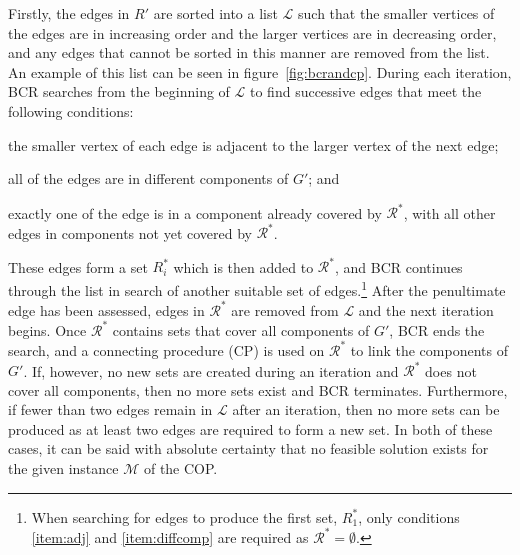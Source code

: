 \documentclass[authoryear]{elsarticle}
\begin{document}
Firstly, the edges in $R'$ are sorted into a list $\mathcal{L}$ such that the smaller vertices of the edges are in increasing order and the larger vertices are in decreasing order, and any edges that cannot be sorted in this manner are removed from the list. An example of this list can be seen in figure~\ref{fig:bcrandcp}. During each iteration, BCR searches from the beginning of $\mathcal{L}$ to find successive edges that meet the following conditions:
\begin{enumerate*}[label={(\roman*)}]
	\item the smaller vertex of each edge is adjacent to the larger vertex of the next edge;\label{item:adj}
	\item all of the edges are in different components of $G'$; \label{item:diffcomp} and
	\item exactly one of the edge is in a component already covered by $\mathcal{R}^*$, with all other edges in components not yet covered by $\mathcal{R}^*$.\label{item:overlap}
\end{enumerate*} 
These edges form a set $R^*_i$ which is then added to $\mathcal{R}^*$, and BCR continues through the list in search of another suitable set of edges.\footnote{When searching for edges to produce the first set, $R^*_1$, only conditions \ref{item:adj} and \ref{item:diffcomp} are required as $\mathcal{R}^* = \emptyset$.} After the penultimate edge has been assessed, edges in $\mathcal{R}^*$ are removed from $\mathcal{L}$ and the next iteration begins. Once $\mathcal{R}^*$ contains sets that cover all components of $G'$, BCR ends the search, and a connecting procedure (CP) is used on $\mathcal{R}^*$ to link the components of $G'$. If, however, no new sets are created during an iteration and $\mathcal{R}^*$ does not cover all components, then no more sets exist and BCR terminates. Furthermore, if fewer than two edges remain in $\mathcal{L}$ after an iteration, then no more sets can be produced as at least two edges are required to form a new set. In both of these cases, it can be said with absolute certainty that no feasible solution exists for the given instance $\mathcal{M}$ of the COP.
\end{document}
